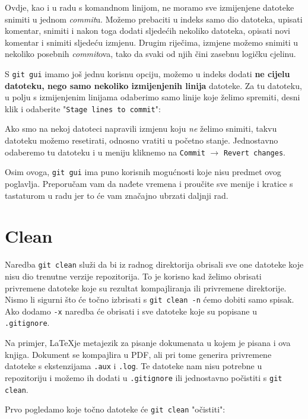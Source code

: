 Ovdje, kao i u radu s komandnom linijom, ne moramo sve izmijenjene datoteke snimiti u jednom \emph{commit}u. 
Možemo prebaciti u indeks samo dio datoteka, upisati komentar, snimiti i nakon toga dodati sljedećih nekoliko datoteka, opisati novi komentar i snimiti sljedeću izmjenu.
Drugim riječima, izmjene možemo snimiti u nekoliko posebnih \emph{commit}ova, tako da svaki od njih čini zasebnu logičku cjelinu.

S \verb+git gui+ imamo još jednu korisnu opciju, možemo u indeks dodati \textbf{ne cijelu datoteku, nego samo nekoliko izmijenjenih linija} datoteke.
Za tu datoteku, u polju s izmijenjenim linijama odaberimo samo linije koje želimo spremiti, desni klik i odaberite "\verb+Stage lines to commit+":


Ako smo na nekoj datoteci napravili izmjenu koju \emph{ne} želimo snimiti, takvu datoteku možemo resetirati, odnosno vratiti u početno stanje. 
Jednostavno odaberemo tu datoteku i u meniju kliknemo na \verb+Commit+ $\rightarrow$ \verb+Revert changes+.

Osim ovoga, \verb+git gui+ ima puno korisnih mogućnosti koje nisu predmet ovog poglavlja.
Preporučam vam da nađete vremena i proučite sve menije i kratice s tastaturom u radu jer to će vam značajno ubrzati daljnji rad.

\section*{Clean}

Naredba \verb+git clean+ služi da bi iz radnog direktorija obrisali sve one datoteke koje nisu dio trenutne verzije repozitorija.
To je korisno kad želimo obrisati privremene datoteke koje su rezultat kompajliranja ili privremene direktorije.
Nismo li sigurni što će točno izbrisati s \verb+git clean -n+ ćemo dobiti samo spisak.
Ako dodamo \verb+-x+ naredba će obrisati i sve datoteke koje su popisane u \verb+.gitignore+.

Na primjer, \LaTeX je metajezik za pisanje dokumenata u kojem je pisana i ova knjiga.
Dokument se kompajlira u PDF, ali pri tome generira privremene datoteke s ekstenzijama \verb+.aux+ i \verb+.log+.
Te datoteke nam nisu potrebne u repozitoriju i možemo ih dodati u \verb+.gitignore+ ili jednostavno počistiti s \verb+git clean+.

Prvo pogledamo koje točno datoteke će \verb+git clean+ "očistiti":

